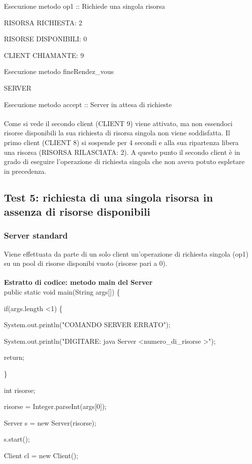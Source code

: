 \documentclass[10pt, a4paper]{article}
\begin{document}
Esecuzione metodo op1 :: Richiede una singola risorsa

RISORSA RICHIESTA: 2

RISORSE DISPONIBILI: 0

CLIENT CHIAMANTE: 9

Esecuzione metodo fineRendez\_vous

SERVER

Esecuzione metodo accept :: Server in attesa di richieste
\\\\
Come si vede il secondo client (CLIENT 9) viene attivato, ma non essendoci risorse disponibili la sua richiesta di risorsa singola non viene soddisfatta. Il primo client (CLIENT 8) si sospende per 4 secondi e alla sua ripartenza libera una risorsa (RISORSA RILASCIATA: 2). A questo punto il secondo client è in grado di eseguire l'operazione di richiesta singola che non aveva potuto espletare in precedenza.
\subsection{Test 5: richiesta di una singola risorsa in assenza di risorse disponibili}
\subsubsection{Server standard}
Viene effettuata da parte di un solo client un'operazione di richiesta singola (op1) su un pool di risorse disponibi vuoto (risorse pari a 0).
\\\\
\textbf{Estratto di codice: metodo main del Server}
\\

public static void main(String args[]) \{

        if(args.length \textless 1) \{

            System.out.println("COMANDO SERVER ERRATO");

            System.out.println("DIGITARE: java Server \textless numero\_di\_risorse \textgreater");

            return;

        \}

        int risorse;

        risorse = Integer.parseInt(args[0]);

        Server s = new Server(risorse);

        s.start();

	Client cl = new Client();
\end{document}
